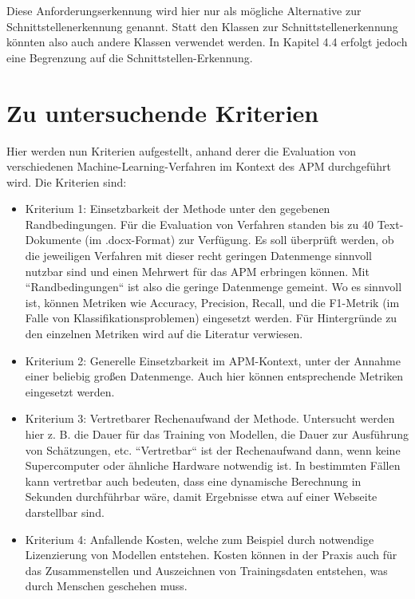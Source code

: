 Diese Anforderungserkennung wird hier nur als mögliche Alternative zur Schnittstellenerkennung genannt. Statt den Klassen zur Schnittstellenerkennung könnten also auch andere Klassen verwendet werden. In Kapitel 4.4 erfolgt jedoch eine Begrenzung auf die Schnittstellen-Erkennung.

\section{Zu untersuchende Kriterien}

Hier werden nun Kriterien aufgestellt, anhand derer die Evaluation von verschiedenen Machine-Learning-Verfahren im Kontext des APM durchgeführt wird. Die Kriterien sind:

\begin{itemize}
  \item Kriterium 1: Einsetzbarkeit der Methode unter den gegebenen Randbedingungen. Für die Evaluation von Verfahren standen bis zu 40 Text-Dokumente (im .docx-Format) zur Verfügung. Es soll überprüft werden, ob die jeweiligen Verfahren mit dieser recht geringen Datenmenge sinnvoll nutzbar sind und einen Mehrwert für das APM erbringen können. Mit ``Randbedingungen`` ist also die geringe Datenmenge gemeint. Wo es sinnvoll ist, können Metriken wie Accuracy, Precision, Recall, und die F1-Metrik (im Falle von Klassifikationsproblemen) eingesetzt werden. Für Hintergründe zu den einzelnen Metriken wird auf die Literatur verwiesen. 
  \item Kriterium 2: Generelle Einsetzbarkeit im APM-Kontext, unter der Annahme einer beliebig großen Datenmenge. Auch hier können entsprechende Metriken eingesetzt werden. 
  \item Kriterium 3: Vertretbarer Rechenaufwand der Methode. Untersucht werden hier z. B. die Dauer für das Training von Modellen, die Dauer zur Ausführung von Schätzungen, etc. ``Vertretbar`` ist der Rechenaufwand dann, wenn keine Supercomputer oder ähnliche Hardware notwendig ist. In bestimmten Fällen kann vertretbar auch bedeuten, dass eine dynamische Berechnung in Sekunden durchführbar wäre, damit Ergebnisse etwa auf einer Webseite darstellbar sind.
  \item 
Kriterium 4: Anfallende Kosten, welche zum Beispiel durch notwendige Lizenzierung von Modellen entstehen. Kosten können in der Praxis auch für das Zusammenstellen und Auszeichnen von Trainingsdaten entstehen, was durch Menschen geschehen muss.  
\end{itemize}


